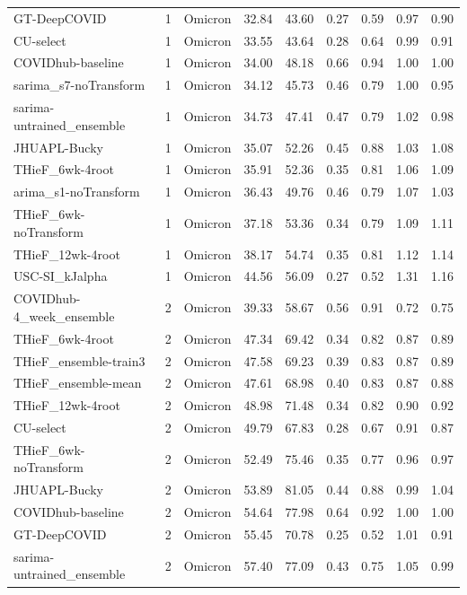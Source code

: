 \documentclass[12pt]{article}
\begin{document}
\begin{longtable}{lrlrrrrrr}
  GT-DeepCOVID & 1 & Omicron & 32.84 & 43.60 & 0.27 & 0.59 & 0.97 & 0.90 \\ 
  CU-select & 1 & Omicron & 33.55 & 43.64 & 0.28 & 0.64 & 0.99 & 0.91 \\ 
  COVIDhub-baseline & 1 & Omicron & 34.00 & 48.18 & 0.66 & 0.94 & 1.00 & 1.00 \\ 
  sarima\_s7-noTransform & 1 & Omicron & 34.12 & 45.73 & 0.46 & 0.79 & 1.00 & 0.95 \\ 
  sarima-untrained\_ensemble & 1 & Omicron & 34.73 & 47.41 & 0.47 & 0.79 & 1.02 & 0.98 \\ 
  JHUAPL-Bucky & 1 & Omicron & 35.07 & 52.26 & 0.45 & 0.88 & 1.03 & 1.08 \\ 
  THieF\_6wk-4root & 1 & Omicron & 35.91 & 52.36 & 0.35 & 0.81 & 1.06 & 1.09 \\ 
  arima\_s1-noTransform & 1 & Omicron & 36.43 & 49.76 & 0.46 & 0.79 & 1.07 & 1.03 \\ 
  THieF\_6wk-noTransform & 1 & Omicron & 37.18 & 53.36 & 0.34 & 0.79 & 1.09 & 1.11 \\ 
  THieF\_12wk-4root & 1 & Omicron & 38.17 & 54.74 & 0.35 & 0.81 & 1.12 & 1.14 \\ 
  USC-SI\_kJalpha & 1 & Omicron & 44.56 & 56.09 & 0.27 & 0.52 & 1.31 & 1.16 \\ 
  COVIDhub-4\_week\_ensemble & 2 & Omicron & 39.33 & 58.67 & 0.56 & 0.91 & 0.72 & 0.75 \\ 
  THieF\_6wk-4root & 2 & Omicron & 47.34 & 69.42 & 0.34 & 0.82 & 0.87 & 0.89 \\ 
  THieF\_ensemble-train3 & 2 & Omicron & 47.58 & 69.23 & 0.39 & 0.83 & 0.87 & 0.89 \\ 
  THieF\_ensemble-mean & 2 & Omicron & 47.61 & 68.98 & 0.40 & 0.83 & 0.87 & 0.88 \\ 
  THieF\_12wk-4root & 2 & Omicron & 48.98 & 71.48 & 0.34 & 0.82 & 0.90 & 0.92 \\ 
  CU-select & 2 & Omicron & 49.79 & 67.83 & 0.28 & 0.67 & 0.91 & 0.87 \\ 
  THieF\_6wk-noTransform & 2 & Omicron & 52.49 & 75.46 & 0.35 & 0.77 & 0.96 & 0.97 \\ 
  JHUAPL-Bucky & 2 & Omicron & 53.89 & 81.05 & 0.44 & 0.88 & 0.99 & 1.04 \\ 
  COVIDhub-baseline & 2 & Omicron & 54.64 & 77.98 & 0.64 & 0.92 & 1.00 & 1.00 \\ 
  GT-DeepCOVID & 2 & Omicron & 55.45 & 70.78 & 0.25 & 0.52 & 1.01 & 0.91 \\ 
  sarima-untrained\_ensemble & 2 & Omicron & 57.40 & 77.09 & 0.43 & 0.75 & 1.05 & 0.99 \\ 

\end{longtable}
\end{document}
